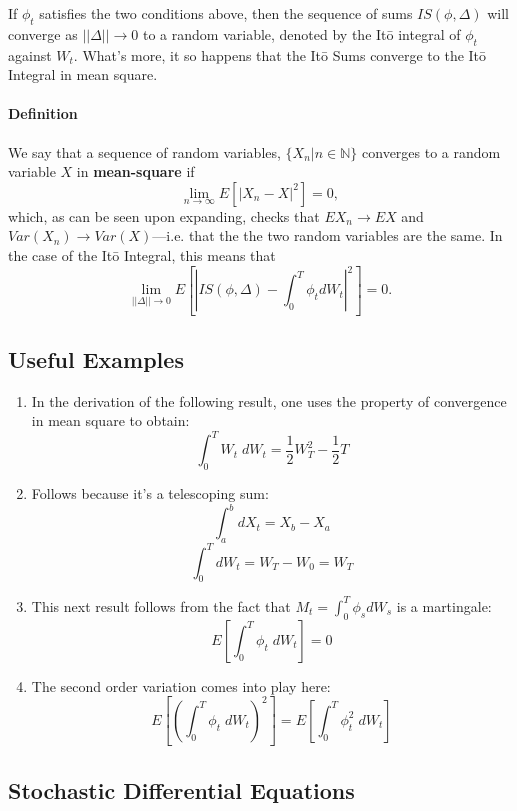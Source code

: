 \documentclass[12pt]{article}
\theoremstyle{plain}
\theoremstyle{definition}
\theoremstyle{remark}
\begin{document}
If $\phi_t$ satisfies the two conditions above, then the sequence of
sums $IS(\phi, \Delta)$ will converge as $||\Delta||\rightarrow 0$ to a
random variable, denoted by the It\={o} integral of $\phi_t$ against
$W_t$. What's more, it so happens that the It\={o} Sums converge to
the It\={o} Integral in mean square.

\paragraph{Definition} We say that a sequence of random variables,
$\{ X_n | n \in \mathbb{N} \}$ converges to a random variable $X$ in
\textbf{mean-square} if
   \[\lim_{n \rightarrow \infty} E\left[ |X_n - X|^2 \right] = 0, \]
which, as can be seen upon expanding, checks that $EX_n \rightarrow
EX$ and $Var(X_n) \rightarrow Var(X)$---i.e. that the the two random
variables are the same.
In the case of the It\={o} Integral, this means that
   \[\lim_{||\Delta||\rightarrow 0} E \left[ \left\lvert IS(\phi, \Delta)
      - \int_0^T \phi_t dW_t \right\rvert^2 \right] = 0.\]

\subsection{Useful Examples}

\begin{enumerate}
   \item{In the derivation of the following result,
      one uses the property of
      convergence in mean square to obtain:
      \[ \int_0^T W_t \; dW_t = \frac{1}{2} W_T^2 - \frac{1}{2} T \]}
   \item{Follows because it's a telescoping sum:
      \[ \int_a^b dX_t = X_b - X_a  \]
      \[ \int_0^T dW_t = W_T - W_0 = W_T \]}
   \item{This next result follows from the fact that $M_t = \int_0^T
      \phi_s dW_s$ is a martingale:
      \[ E\left[\int_0^T \phi_t \; dW_t\right] = 0 \]}
   \item{The second order variation comes into play here:
      \[ E\left[\left(\int_0^T \phi_t \; dW_t\right)^2\right] =
      E\left[\int_0^T \phi^2_t \; dW_t\right] \]}
\end{enumerate}




\subsection{Stochastic Differential Equations}
\end{document}
